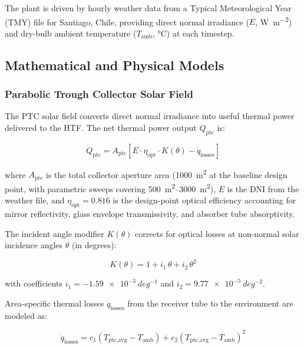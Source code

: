 \documentclass[11pt,review,3p]{elsarticle}
\begin{document}
The plant is driven by hourly weather data from a Typical Meteorological Year (TMY) file for Santiago, Chile, providing direct normal irradiance ($E$, \si{W.m^{-2}}) and dry-bulb ambient temperature ($T_{\text{amb}}$, \si{\celsius}) at each timestep.

\subsection{Mathematical and Physical Models}
\label{sec:physics}

\subsubsection{Parabolic Trough Collector Solar Field}
\label{sec:ptc_model}

The PTC solar field converts direct normal irradiance into useful thermal power delivered to the HTF. The net thermal power output $\dot{Q}_{\text{ptc}}$ is:

\begin{equation}
    \dot{Q}_{\text{ptc}} = A_{\text{ptc}} \left[ E \cdot \eta_{\text{opt}} \cdot K(\theta) - \dot{q}_{\text{losses}} \right]
    \label{eq:ptc_power}
\end{equation}

where $A_{\text{ptc}}$ is the total collector aperture area (\SI{1000}{m^2} at the baseline design point, with parametric sweeps covering \SIrange{500}{3000}{m^2}), $E$ is the DNI from the weather file, and $\eta_{\text{opt}} = 0.816$ is the design-point optical efficiency accounting for mirror reflectivity, glass envelope transmissivity, and absorber tube absorptivity.

The incident angle modifier $K(\theta)$ corrects for optical losses at non-normal solar incidence angles $\theta$ (in degrees):

\begin{equation}
    K(\theta) = 1 + i_{1}\, \theta + i_{2}\, \theta^{2}
    \label{eq:iam}
\end{equation}

with coefficients $i_{1} = \num{-1.59e-3}\ \si{deg^{-1}}$ and $i_{2} = \num{9.77e-5}\ \si{deg^{-2}}$.

Area-specific thermal losses $\dot{q}_{\text{losses}}$ from the receiver tube to the environment are modeled as:

\begin{equation}
    \dot{q}_{\text{losses}} = c_{1} \left(T_{\text{ptc,avg}} - T_{\text{amb}}\right) + c_{2} \left(T_{\text{ptc,avg}} - T_{\text{amb}}\right)^{2}
    \label{eq:ptc_loss}
\end{equation}
\end{document}
